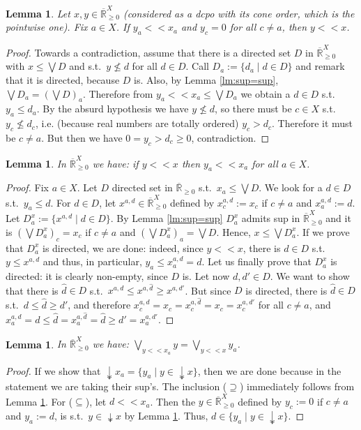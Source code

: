 \documentclass[submission,copyright,creativecommons]{eptcs}
\newtheorem{Lemma}[theorem]{Lemma}
\newcommand{\R}{\mathbb{R}}
\newcommand{\set}[1]{\{#1\}}
\begin{document}
\begin{Lemma}\label{lm:<<RX}
 Let $x,y\in \overline{\R}_{\geq 0}^X$ (considered as a dcpo with its cone order, which is the pointwise one). Fix $a\in X$.
 If $y_a<<x_a$ and $y_c=0$ for all $c\neq a$, then $y<<x$.
\end{Lemma}
\begin{proof}
 Towards a contradiction, assume that there is a directed set $D$ in $\overline{\R}_{\geq 0}^X$ with $x\leq\bigvee D$ and s.t.\ $y\not\leq d$ for all $d\in D$.
 Call $D_a:=\set{d_a\mid d\in D}$ and remark that it is directed, because $D$ is.
 Also, by Lemma \ref{lm:sup=sup}, $\bigvee D_a = \left(\bigvee D\right)_a$.
 Therefore from $y_a<<x_a\leq \bigvee D_a$ we obtain a $d\in D$ s.t.\ $y_a\leq d_a$.
 By the absurd hypothesis we have $y\not\leq d$, so there must be $c\in X$ s.t.\ $y_c\not\leq d_c$, i.e. (because real numbers are totally ordered) $y_c>d_c$.
 Therefore it must be $c\neq a$.
 But then we have $0=y_c>d_c\geq 0$, contradiction.
\end{proof}

\begin{Lemma}\label{lm:<<_a}
 In $\overline{\R}_{\geq 0}^X$ we have:
 if $y<<x$ then $y_a<< x_a$ for all $a\in X$.
\end{Lemma}
\begin{proof}
 Fix $a\in X$.
 Let $D$ directed set in $\overline{\R}_{\geq 0}$ s.t.\ $x_a\leq\bigvee D$.
 We look for a $d\in D$ s.t.\ $y_a\leq d$.
 For $d\in D$, let $x^{a,d}\in\overline{\R}_{\geq 0}^X$ defined by $x^{a,d}_c:=x_c$ if $c\neq a$ and $x^{a,d}_a:=d$.
 Let $D^x_a:=\set{x^{a,d}\mid d\in D}$.
 By Lemma \ref{lm:sup=sup} $D^x_a$ admits sup in $\overline{\R}_{\geq 0}^X$ and it is $(\bigvee D^x_a)_c=x_c$ if $c\neq a$ and $(\bigvee D^x_a)_a=\bigvee D$.
 Hence, $x\leq \bigvee D^x_a$.
 If we prove that $D^x_a$ is directed, we are done: indeed, since $y<<x$, there is $d\in D$ s.t.\ $y\leq x^{a,d}$ and thus, in particular, $y_a\leq x^{a,d}_a=d$.
 Let us finally prove that $D^x_a$ is directed: it is clearly non-empty, since $D$ is.
 Let now $d,d'\in D$.
 We want to show that there is $\hat d\in D$ s.t.\ $x^{a,d}\leq x^{a,\hat d}\geq x^{a,d'}$.
 But since $D$ is directed, there is $\hat d\in D$ s.t.\ $d\leq \hat d\geq d'$, and therefore $x^{a,d}_c=x_c= x^{a,\hat d}_c =x_c=x^{a,d'}_c$ for all $c\neq a$, and $x^{a,d}_a=d\leq \hat d=x^{a,\hat d}_a=\hat d \geq d'=x^{a,d'}_a$.
\end{proof}

\begin{Lemma}\label{rmk:sup_a=sup_a}
In $\overline{\R}_{\geq 0}^X$ we have:
$\bigvee\limits_{y<<x_a} y = \bigvee\limits_{y<<x} y_a$.
\end{Lemma}
\begin{proof}
 If we show that $\twoheaddownarrow x_a = \set{y_a\mid y\in\twoheaddownarrow x}$, then we are done because in the statement we are taking their sup's.
 The inclusion ($\supseteq$) immediately follows from Lemma \ref{lm:<<_a}. For ($\subseteq$), let $d<< x_a$.
 Then the $y\in \overline{\R}_{\geq 0}^X$ defined by $y_c:=0$ if $c\neq a$ and $y_a:=d$, is s.t.\ $y\in\twoheaddownarrow x$ by Lemma \ref{lm:<<RX}.
 Thus, $d\in \set{y_a\mid y\in\twoheaddownarrow x}$.
\end{proof}
\end{document}
